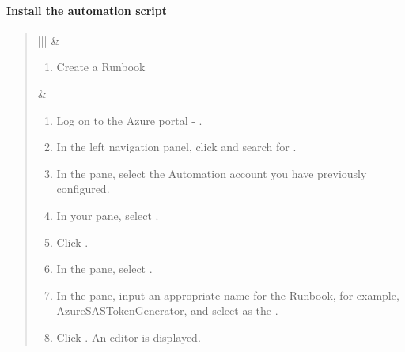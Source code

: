 \documentclass[letterpaper,10pt,english]{sphinxmanual}
\begin{document}
\paragraph{Install the automation script}
\label{\detokenize{mcdmp_app_ug:install-automation-script}}\label{\detokenize{mcdmp_app_ug:install-the-automation-script}}
\begin{quote}


\begin{savenotes}\sphinxattablestart
\centering
\begin{tabular}[t]{|*{2}{|}}
\hline
{}\relax &\relax \\
\hline\begin{enumerate}
\item {} 
Create a Runbook

\end{enumerate}
&\begin{enumerate}
\item {} 
Log on to the Azure portal -
.

\item {} 
In the left navigation panel, click 
and search for .

\item {} 
In the  pane, select the
Automation account you have previously configured.

\item {} 
In your  pane, select
.

\item {} 
Click .

\item {} 
In the  pane, select .

\item {} 
In the  pane, input an appropriate
name for the Runbook, for example,
AzureSASTokenGenerator, and select  as the .

\item {} 
Click .
An editor is displayed.


\end{enumerate}
\end{tabular}
\end{savenotes}
\end{quote}
\end{document}
